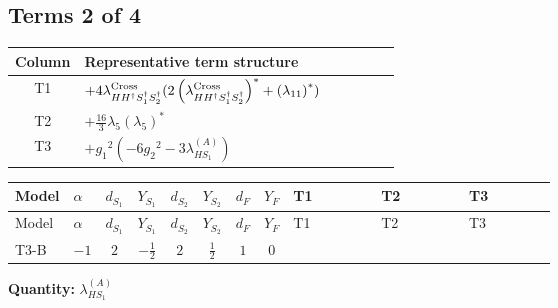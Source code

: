 \documentclass[8pt]{article}
\begin{document}
\begin{landscape}
\subsection*{Terms 2 of 4}
\begin{center}
\begin{tabular}{@{}c >{\raggedright\arraybackslash}p{0.82\linewidth}@{}}
\toprule
Column & Representative term structure \\
\midrule
T1 & \(\displaystyle +4 {\lambda_{H H^\dagger S_1^\dagger S_2^\dagger}^{\rm Cross}} (2 \left({\lambda_{H H^\dagger S_1^\dagger S_2^\dagger}^{\rm Cross}}\right)^{*}+\left({\lambda_{11}}\right)^{*})\) \\
\midrule
T2 & \(\displaystyle +\frac{16}{3} {\lambda_5} \left({\lambda_5}\right)^{*}\) \\
\midrule
T3 & \(\displaystyle +{g_1}^2 \left(-6 {g_2}^2-3 {\lambda_{HS_1}^{(A)}}\right)\) \\
\midrule
\bottomrule
\end{tabular}
\end{center}
\smallskip
\tiny
\begin{longtable}{@{}llcccccc >{\raggedright\arraybackslash}p{0.21\linewidth} >{\raggedright\arraybackslash}p{0.21\linewidth} >{\raggedright\arraybackslash}p{0.21\linewidth}@{}}
\toprule
Model & $\alpha$ & $d_{S_1}$ & $Y_{S_1}$ & $d_{S_2}$ & $Y_{S_2}$ & $d_F$ & $Y_F$ & T1 & T2 & T3 \\
\midrule
\endfirsthead
\toprule
Model & $\alpha$ & $d_{S_1}$ & $Y_{S_1}$ & $d_{S_2}$ & $Y_{S_2}$ & $d_F$ & $Y_F$ & T1 & T2 & T3 \\
\midrule
\endhead
T3-B & $-1$ & $2$ & $-\frac{1}{2}$ & $2$ & $\frac{1}{2}$ & $1$ & $0$ & \scriptsize\adjustbox{max width=\linewidth}{$\begin{gathered} +4 {\lambda_{H H^\dagger S_1^\dagger S_2^\dagger}^{\rm Cross}} (2 \left({\lambda_{H H^\dagger S_1^\dagger S_2^\dagger}^{\rm Cross}}\right)^{*}+\left({\lambda_{11}}\right)^{*})\end{gathered}$} & \scriptsize\adjustbox{max width=\linewidth}{$\begin{gathered} +\frac{16}{3} {\lambda_5} \left({\lambda_5}\right)^{*}\end{gathered}$} & \scriptsize\adjustbox{max width=\linewidth}{$\begin{gathered} +{g_1}^2 \left(-6 {g_2}^2-3 {\lambda_{HS_1}^{(A)}}\right)\end{gathered}$} \\
\midrule
\bottomrule
\end{longtable}
\clearpage
\noindent\textbf{Quantity: }$\lambda_{HS_1}^{(A)}$\par\smallskip

\end{landscape}
\end{document}
